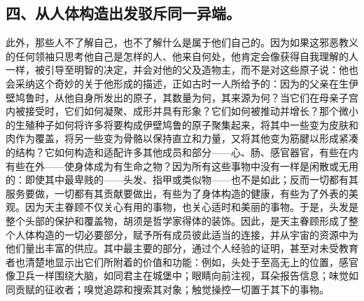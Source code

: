 
\subsection{四、从人体构造出发驳斥同一异端。}

此外，那些人不了解自己，也不了解什么是属于他们自己的。因为如果这邪恶教义的任何领袖只思考他自己是怎样的人、他来自何处，他肯定会像获得自我理解的人一样，被引导至明智的决定，并会对他的父及造物主，而不是对这些原子说：他也会采纳这个奇妙的关于他形成的描述，正如古时一人所给予的：因为的父亲在生伊壁鸠鲁时，从他自身所发出的原子，其数量为何，其来源为何？当它们在母亲子宫内被接受时，它们如何凝聚、成形并具有形象？它们如何被推动并增长？那个微小的生殖种子如何将许多将要构成伊壁鸠鲁的原子聚集起来，将其中一些变为皮肤和肉作为覆盖，将另一些变为骨骼以保持直立和力量，又将其他变为筋腱以形成紧凑的结构？它如何构造和适配许多其他成员和部分——心、肠、感官器官，有些在内有些在外——使身体成为有生命之物？因为所有这些事物中没有一样是闲散或无用的：即使其中最卑贱的——头发、指甲或类似物——也不是如此；反而一切都有其服务要做，一切都有其贡献要做出，有些为了身体构造的健康，有些为了外表的美观。因为天主眷顾不仅关心有用的事物，也关心适时和美丽的事物。于是，头发是整个头部的保护和覆盖物，胡须是哲学家得体的装饰。因此，是天主眷顾形成了整个人体构造的一切必要部分，赋予所有成员彼此适当的连接，并从宇宙的资源中为他们量出丰富的供应。其中最主要的部分，通过个人经验的证明，甚至对未受教育者也清楚地显示出它们所附着的价值和功能：例如，头处于至高无上的位置，感官像卫兵一样围绕大脑，如同君主在城堡中；眼睛向前注视，耳朵报告信息；味觉如同贡赋的征收者；嗅觉追踪和搜索其对象；触觉操控一切置于其下的事物。\par

